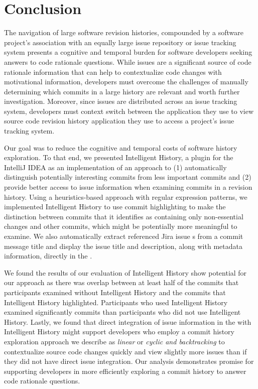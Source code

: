 \chapter{Conclusion}
\label{ch:Conclusion}

The navigation of large software revision histories, compounded by a software
project's association with an equally large issue repository or issue tracking system
presents a cognitive and temporal burden for software developers seeking 
answers to code rationale questions.
While issues are a significant source of code rationale information that
can help to contextualize code changes with motivational information,
developers must overcome the challenges of manually determining
which commits in a large history are relevant and worth further investigation.
Moreover, since issues are distributed across an issue tracking system,
developers must context switch between the application they use to view
source code revision history  application they use to access a project's issue tracking system.

Our goal was to reduce the cognitive and temporal costs of software history exploration.
To that end, we presented Intelligent History, a plugin for the IntelliJ IDEA 
as an implementation of an approach to (1) automatically distinguish potentially interesting
commits from less important commits and (2) provide better access to issue information 
when examining commits in a revision history.
Using a heuristics-based approach with regular expression patterns, 
we implemented Intelligent History to use commit highlighting 
to make the distinction between commits that it identifies as containing
only non-essential changes and other commits, which might be potentially more meaningful to examine.
We also automatically extract referenced Jira issue s from a commit message title
and display the issue title and description, along with metadata information, directly in the .

We found  the results of our evaluation of Intelligent History show
potential for our approach as there was overlap between at least half of the commits
that participants examined without Intelligent History and the commits that Intelligent History
highlighted. Participants who used Intelligent History examined significantly
 commits than participants who did not use Intelligent History.
Lastly, we found that direct integration of issue information in the 
with Intelligent History might support developers who employ a commit history exploration approach
we describe as \textit{linear} or \textit{cyclic and backtracking} to contextualize
source code changes quickly and view slightly more issues than if they did not have
direct issue integration.
Our analysis demonstrates promise for supporting developers in more
efficiently exploring a commit history to answer code rationale questions.